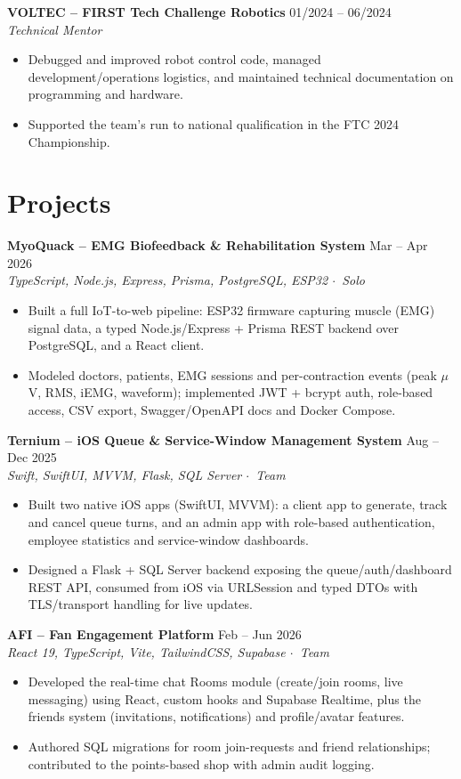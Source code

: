 \documentclass[10pt,letterpaper]{article}
\newcommand{\project}[3]{\vspace{2pt}\textbf{#1} \hfill #2 \\ \textit{#3} \par\vspace{1pt}}
\newcommand{\resumeSubheading}[3]{%
  \vspace{2pt}\textbf{#1} \hfill #2 \\
  \textit{#3} \\
}
\begin{document}
\resumeSubheading{VOLTEC -- FIRST Tech Challenge Robotics}{01/2024 -- 06/2024}{Technical Mentor}
\begin{itemize}
    \item Debugged and improved robot control code, managed development/operations logistics, and maintained technical documentation on programming and hardware.
    \item Supported the team's run to national qualification in the FTC 2024 Championship.
\end{itemize}

\section{Projects}
\project{MyoQuack -- EMG Biofeedback \& Rehabilitation System}{Mar -- Apr 2026}{TypeScript, Node.js, Express, Prisma, PostgreSQL, ESP32 \quad $\cdot$\ Solo}
\begin{itemize}
    \item Built a full IoT-to-web pipeline: ESP32 firmware capturing muscle (EMG) signal data, a typed Node.js/Express + Prisma REST backend over PostgreSQL, and a React client.
    \item Modeled doctors, patients, EMG sessions and per-contraction events (peak $\mu$V, RMS, iEMG, waveform); implemented JWT + bcrypt auth, role-based access, CSV export, Swagger/OpenAPI docs and Docker Compose.
\end{itemize}

\project{Ternium -- iOS Queue \& Service-Window Management System}{Aug -- Dec 2025}{Swift, SwiftUI, MVVM, Flask, SQL Server \quad $\cdot$\ Team}
\begin{itemize}
    \item Built two native iOS apps (SwiftUI, MVVM): a client app to generate, track and cancel queue turns, and an admin app with role-based authentication, employee statistics and service-window dashboards.
    \item Designed a Flask + SQL Server backend exposing the queue/auth/dashboard REST API, consumed from iOS via URLSession and typed DTOs with TLS/transport handling for live updates.
\end{itemize}

\project{AFI -- Fan Engagement Platform}{Feb -- Jun 2026}{React 19, TypeScript, Vite, TailwindCSS, Supabase \quad $\cdot$\ Team}
\begin{itemize}
    \item Developed the real-time chat Rooms module (create/join rooms, live messaging) using React, custom hooks and Supabase Realtime, plus the friends system (invitations, notifications) and profile/avatar features.
    \item Authored SQL migrations for room join-requests and friend relationships; contributed to the points-based shop with admin audit logging.
\end{itemize}
\end{document}
